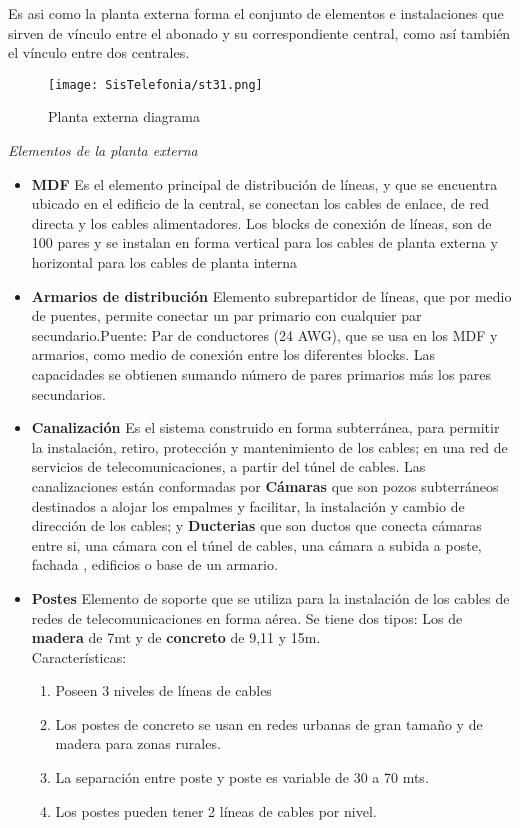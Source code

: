\documentclass[
	12pt, %
	fleqn, %
	a4paper, %
	oneside, %
]{LegrandOrangeBook}
\begin{document}
Es asi como la planta externa forma el conjunto de elementos e instalaciones que sirven de vínculo entre el abonado y su correspondiente central, como así también el vínculo entre dos centrales.
\begin{figure}[H]
\centering\texttt{[image: SisTelefonia/st31.png]}
\caption{Planta externa diagrama}
\label{fig:Planta externa diagrama}
\end{figure}
\textit{Elementos de la planta externa}
\begin{itemize}
\item \textbf{MDF} Es el elemento principal de distribución de líneas, y que se encuentra ubicado en el edificio de la central, se conectan los cables de enlace, de red directa y los cables alimentadores. Los blocks de conexión de líneas, son de 100 pares y se instalan en forma vertical para los cables de planta externa y horizontal para los cables de planta interna
\item \textbf{Armarios de distribución} Elemento subrepartidor de líneas, que por medio de puentes, permite conectar un par primario con cualquier par secundario.Puente: Par de conductores (24 AWG), que se usa en los MDF y armarios, como medio de conexión entre los diferentes blocks. Las capacidades se obtienen sumando número de pares primarios más los pares secundarios.
\item \textbf{Canalización} Es el sistema construido en forma subterránea, para permitir la instalación, retiro, protección  y  mantenimiento  de los cables; en  una red de servicios de telecomunicaciones, a partir del túnel de cables.
Las canalizaciones están conformadas por \textbf{Cámaras} que son pozos subterráneos destinados a alojar los empalmes y facilitar, la instalación y cambio de dirección de los cables; y \textbf{Ducterias} que son ductos que conecta cámaras entre si, una cámara con el túnel de cables, una cámara  a subida  a poste, fachada , edificios o base de un armario.
\item \textbf{Postes} Elemento de soporte que se utiliza para la instalación de los cables de redes de telecomunicaciones en  forma aérea. Se tiene dos tipos: Los de \textbf{madera} de 7mt y de \textbf{concreto} de 9,11 y 15m.\\
Características:
\begin{enumerate}
\item Poseen  3 niveles de líneas de cables
\item Los postes de concreto se usan en redes urbanas de gran tamaño y de madera para zonas rurales.
\item La separación entre poste y poste es variable de 30 a 70 mts.
\item Los postes pueden tener 2 líneas de cables por nivel.  
\end{enumerate}
\end{itemize}
\end{document}
